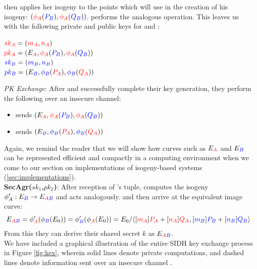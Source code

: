 \alice then applies her isogeny to the points which \bob will use in the creation of his isogeny: $(\pa(\genpb),\pa(\genqb))$. \bob performs the analogous operation. This leaves us with the following private and public keys for \alice and \bob:

\begin{center}
$\ska = (\ma,\na)$\\
$\pka = (E_{\ba}, \pa(\genpb),\pa(\genqb))$\\
$\skb = (\mb,\nb)$\\
$\pkb = (E_{\rb}, \pb(\genpa),\pb(\genqa))$\\
\end{center}

\noindent
\textit{PK Exchange}: After \alice and \bob successfully complete their key generation, they perform the following over an insecure channel:
\begin{itemize}
\item \alice sends \bob $(E_{\ba}, \pa(\genpb), \pa(\genqb))$
\item \bob sends \alice $(E_{\rb}, \pb(\genpa), \pb(\genqa))$
\end{itemize}

Again, we remind the reader that we will show how curves such as $E_{\ba}$ and $E_{\rb}$ can be represented efficient and compactly in a computing environment when we come to our section on implementations of isogeny-based systems (\ref{sec:implementations}).\\

\noindent
\textbf{SecAgr($sk_{1}$,$pk_{2}$)}: After reception of \bob's tuple, \alice computes the isogeny $\phi'_A: E_{\rb} \rightarrow E_{\ba\rb}$ and \bob acts analogously. \alice and \bob then arrive at the equivalent image curve:
$$
E_{\ba\rb} = \phi'_{\ba}(\phi_{\rb}(E_0)) = \phi'_{\rb}(\phi_{\ba}(E_0)) = E_0/ \langle [\ma]\genpa + [\na]\genqa, [\mb]\genpb + [\nb]\genqb \rangle
$$
From this they can derive their shared secret $k$ as $E_{\ba\rb}$.\\

\noindent
We have included a graphical illustration of the entire SIDH key exchange process in Figure \ref{fig:kex}, wherein solid lines denote private computations, and dashed lines denote information sent over an insecure channel \cite{djp}.

